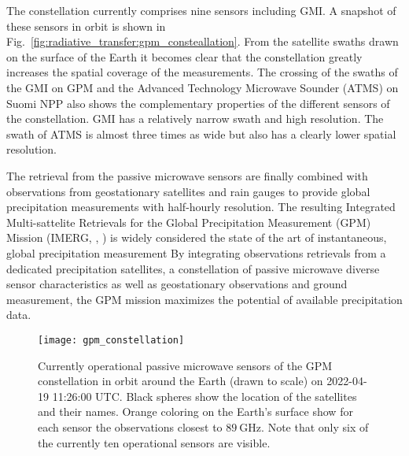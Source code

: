 The constellation currently comprises nine sensors including GMI. A snapshot of
these sensors in orbit is shown in
Fig.~\ref{fig:radiative_transfer:gpm_consteallation}. From the satellite swaths
drawn on the surface of the Earth it becomes clear that the constellation
greatly increases the spatial coverage of the measurements. The crossing of the
swaths of the GMI on GPM and the Advanced Technology Microwave Sounder (ATMS) on
Suomi NPP also shows the complementary properties of the different sensors of
the constellation. GMI has a relatively narrow swath and high resolution. The
swath of ATMS is almost three times as wide but also has a clearly lower spatial
resolution.

The retrieval from the passive microwave sensors are finally combined with
observations from geostationary satellites and rain gauges to provide global
precipitation measurements with half-hourly resolution. The resulting Integrated
Multi-sattelite Retrievals for the Global Precipitation Measurement (GPM)
Mission (IMERG, \citeauthor{huffman20}, \citeyear{huffman20}) is widely
considered the state of the art of instantaneous, global precipitation
measurement By integrating observations retrievals from a dedicated
precipitation satellites, a constellation of passive microwave diverse sensor
characteristics as well as geostationary observations and ground measurement,
the GPM mission maximizes the potential of available precipitation data.


\begin{figure}[!hbpt]
\centering
\texttt{[image: gpm\_constellation]}
\caption{
Currently operational passive microwave sensors of the GPM constellation in
orbit around the Earth (drawn to scale) on 2022-04-19 11:26:00 UTC. Black
spheres show the location of the satellites and their names. Orange coloring on
the Earth's surface show for each sensor the observations closest to
$\SI{89}{\giga \hertz}$. Note that only six of the currently ten operational
sensors are visible.
}
\label{fig:radiative_transfer:gpm_constallation}
\end{figure}




